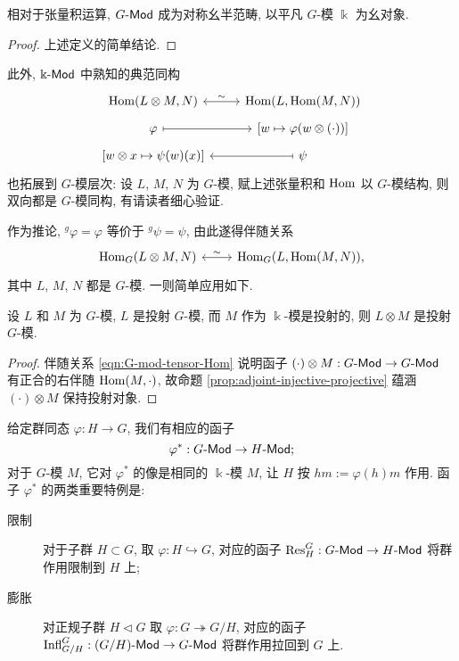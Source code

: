 \begin{proposition}\label{prop:Gmod-monoidal}
	相对于张量积运算, $G\text{-}\mathsf{Mod}$ 成为对称幺半范畴, 以平凡 $G$-模 $\Bbbk$ 为幺对象.
\end{proposition}
\begin{proof}
	上述定义的简单结论.
\end{proof}

此外, $\Bbbk\text{-}\mathsf{Mod}$ 中熟知的典范同构
\begin{equation*}
	\begin{tikzcd}[row sep=tiny]
		\Hom(L \otimes M, N) \arrow[leftrightarrow, r, "\sim"] & \Hom(L, \Hom(M, N)) \\
		\varphi \arrow[mapsto, r] & {\left[ w \mapsto \varphi(w \otimes (\cdot)) \right]} \\
		{\left[ w \otimes x \mapsto \psi(w)(x) \right]} & \psi \arrow[mapsto, l]
	\end{tikzcd}
\end{equation*}
也拓展到 $G$-模层次: 设 $L$, $M$, $N$ 为 $G$-模, 赋上述张量积和 $\operatorname{Hom}$ 以 $G$-模结构, 则双向都是 $G$-模同构, 有请读者细心验证.

作为推论, ${}^g \varphi = \varphi$ 等价于 ${}^g \psi = \psi$, 由此遂得伴随关系
\begin{equation}\label{eqn:G-mod-tensor-Hom}
	\begin{tikzcd}
		\Hom_G(L \otimes M, N) \arrow[leftrightarrow, r, "\sim"] & \Hom_G(L, \Hom(M, N)),
	\end{tikzcd}
\end{equation}
其中 $L$, $M$, $N$ 都是 $G$-模. 一则简单应用如下.

\begin{proposition}\label{prop:group-tensor-proj}
	设 $L$ 和 $M$ 为 $G$-模, $L$ 是投射 $G$-模, 而 $M$ 作为 $\Bbbk$-模是投射的, 则 $L \otimes M$ 是投射 $G$-模.
\end{proposition}
\begin{proof}
	伴随关系 \eqref{eqn:G-mod-tensor-Hom} 说明函子 $(\cdot) \otimes M: G\text{-}\mathsf{Mod} \to G\text{-}\mathsf{Mod}$ 有正合的右伴随 $\operatorname{Hom}(M, \cdot)$, 故命题 \ref{prop:adjoint-injective-projective} 蕴涵 $(\cdot) \otimes M$ 保持投射对象.
\end{proof}

\begin{definition}[限制与膨胀]\label{def:Res-Infl}
	给定群同态 $\varphi: H \to G$, 我们有相应的函子
	\[ \varphi^*: G\text{-}\mathsf{Mod} \to H\text{-}\mathsf{Mod}; \]
	对于 $G$-模 $M$, 它对 $\varphi^*$ 的像是相同的 $\Bbbk$-模 $M$, 让 $H$ 按 $hm := \varphi(h)m$ 作用. 函子 $\varphi^*$ 的两类重要特例是:
	\begin{description}
		\item[限制] 对于子群 $H \subset G$, 取 $\varphi: H \hookrightarrow G$, 对应的函子 $\operatorname{Res}^G_H: G\text{-}\mathsf{Mod} \to H\text{-}\mathsf{Mod}$ 将群作用限制到 $H$ 上;
		\item[膨胀] 对正规子群 $H \lhd G$ 取 $\varphi: G \twoheadrightarrow G/H$, 对应的函子 $\mathrm{Infl}^G_{G/H}: (G/H)\text{-}\mathsf{Mod} \to G\text{-}\mathsf{Mod}$ 将群作用拉回到 $G$ 上.
	\end{description}
\end{definition}

